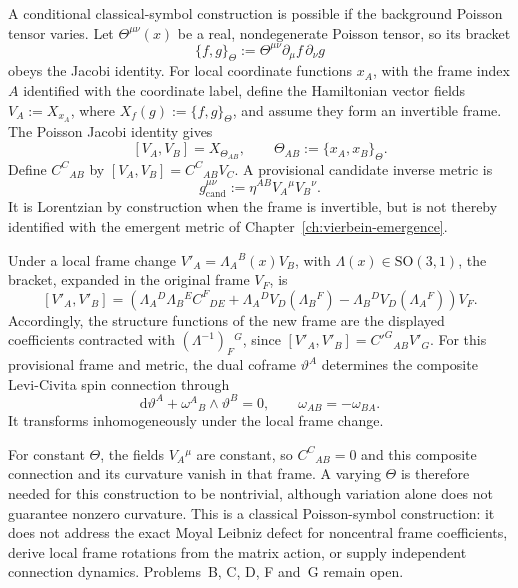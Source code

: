 A conditional classical-symbol construction is possible if the
background Poisson tensor varies. Let
\(\Theta^{\mu\nu}(x)\) be a real, nondegenerate Poisson tensor,
so its bracket
\[
  \{f,g\}_\Theta
  :=\Theta^{\mu\nu}\partial_\mu f\,\partial_\nu g
\]
obeys the Jacobi identity. For local coordinate functions \(x_A\),
with the frame index \(A\) identified with the coordinate label,
define the Hamiltonian vector fields
\(V_A:=X_{x_A}\), where \(X_f(g):=\{f,g\}_\Theta\), and assume
they form an invertible frame. The Poisson Jacobi identity gives
\[
  [V_A,V_B]=X_{\Theta_{AB}},
  \qquad
  \Theta_{AB}:=\{x_A,x_B\}_\Theta .
\]
Define \(C^C{}_{AB}\) by
\([V_A,V_B]=C^C{}_{AB}V_C\). A provisional candidate inverse
metric is
\[
  g_{\mathrm{cand}}^{\mu\nu}
  :=\eta^{AB}V_A{}^\mu V_B{}^\nu .
\]
It is Lorentzian by construction when the frame is invertible, but
is not thereby identified with the emergent metric of
Chapter~\ref{ch:vierbein-emergence}.

Under a local frame change
\(V'_A=\Lambda_A{}^B(x)V_B\), with
\(\Lambda(x)\in\mathrm{SO}(3,1)\), the bracket, expanded in the
original frame \(V_F\), is
\[
  [V'_A,V'_B]
  =
  \left(
    \Lambda_A{}^D\Lambda_B{}^E C^F{}_{DE}
    +\Lambda_A{}^D V_D(\Lambda_B{}^F)
    -\Lambda_B{}^D V_D(\Lambda_A{}^F)
  \right)V_F .
\]
Accordingly, the structure functions of the new frame are the
displayed coefficients contracted with
\((\Lambda^{-1})_F{}^G\), since
\([V'_A,V'_B]=C'^G{}_{AB}V'_G\). For this provisional frame
and metric, the dual coframe \(\vartheta^A\) determines the
composite Levi-Civita spin connection through
\[
  \mathrm{d}\vartheta^A+\omega^A{}_B\wedge\vartheta^B=0,
  \qquad
  \omega_{AB}=-\omega_{BA}.
\]
It transforms inhomogeneously under the local frame change.

For constant \(\Theta\), the fields \(V_A{}^\mu\) are constant,
so \(C^C{}_{AB}=0\) and this composite connection and its
curvature vanish in that frame. A varying \(\Theta\) is therefore
needed for this construction to be nontrivial, although variation
alone does not guarantee nonzero curvature. This is a
classical Poisson-symbol construction: it does not address the
exact Moyal Leibniz defect for noncentral frame coefficients, derive
local frame rotations from the matrix action, or supply independent
connection dynamics. Problems~B, C, D, F and~G remain open.

